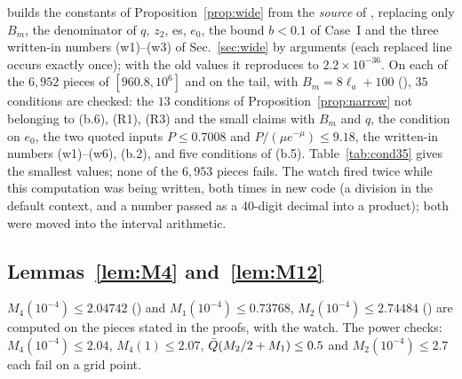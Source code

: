  builds the constants of Proposition~\ref{prop:wide} from the \emph{source} of , replacing only $B_m$, the denominator of $q$, $z_2$, es, $e_0$, the bound $b<0.1$ of Case~I and the three written-in numbers (w1)--(w3) of Sec.~\ref{sec:wide} by arguments (each replaced line occurs exactly once); with the old values it reproduces  to $2.2\times10^{-36}$.
On each of the $6{,}952$ pieces of $[960.8,10^6]$ and on the tail, with $B_m=8\ell_a+100$ (), $35$ conditions are checked: the $13$ conditions of Proposition~\ref{prop:narrow} not belonging to (b.6), (R1), (R3) and the small claims with $B_m$ and $q$, the condition on $e_0$, the two quoted inputs $P\le0.7008$ and $P/(\mu e^{-\mu})\le9.18$, the written-in numbers (w1)--(w6), (b.2), and five conditions of (b.5).
Table~\ref{tab:cond35} gives the smallest values; none of the $6{,}953$ pieces fails.
The watch fired twice while this computation was being written, both times in new code (a division in the default context, and a number passed as a 40-digit decimal into a product); both were moved into the interval arithmetic.

\subsection{Lemmas~\ref{lem:M4} and~\ref{lem:M12}}

$M_4(10^{-4})\le2.04742$ () and $M_1(10^{-4})\le0.73768$, $M_2(10^{-4})\le2.74484$ () are computed on the pieces stated in the proofs, with the watch.
The power checks: $M_4(10^{-4})\le2.04$, $M_4(1)\le2.07$, $\bar Q(M_2/2+M_1)\le0.5$ and $M_2(10^{-4})\le2.7$ each fail on a grid point.
